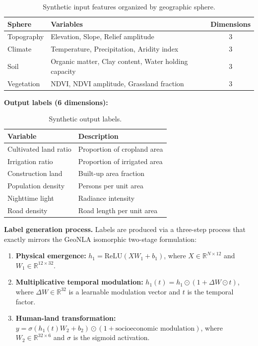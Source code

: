 \documentclass[a4paper,11pt]{article}
\begin{document}
\begin{table}[htbp]
\centering
\caption{Synthetic input features organized by geographic sphere.}
\label{tab:input_features}
\begin{tabular}{llc}
\toprule
Sphere & Variables & Dimensions \\
\midrule
Topography & Elevation, Slope, Relief amplitude & 3 \\
Climate & Temperature, Precipitation, Aridity index & 3 \\
Soil & Organic matter, Clay content, Water holding capacity & 3 \\
Vegetation & NDVI, NDVI amplitude, Grassland fraction & 3 \\
\bottomrule
\end{tabular}
\end{table}

\textbf{Output labels (6 dimensions):}

\begin{table}[htbp]
\centering
\caption{Synthetic output labels.}
\label{tab:output_labels}
\begin{tabular}{ll}
\toprule
Variable & Description \\
\midrule
Cultivated land ratio & Proportion of cropland area \\
Irrigation ratio & Proportion of irrigated area \\
Construction land & Built-up area fraction \\
Population density & Persons per unit area \\
Nighttime light & Radiance intensity \\
Road density & Road length per unit area \\
\bottomrule
\end{tabular}
\end{table}

\textbf{Label generation process.} Labels are produced via a three-step process that exactly mirrors the GeoNLA isomorphic two-stage formulation:

\begin{enumerate}[label=\arabic*.]
    \item \textbf{Physical emergence:} $h_1 = \text{ReLU}(X W_1 + b_1)$, where $X \in \mathbb{R}^{N \times 12}$ and $W_1 \in \mathbb{R}^{12 \times 32}$.
    \item \textbf{Multiplicative temporal modulation:} $h_1(t) = h_1 \odot (1 + \Delta W \odot t)$, where $\Delta W \in \mathbb{R}^{32}$ is a learnable modulation vector and $t$ is the temporal factor.
    \item \textbf{Human-land transformation:} $y = \sigma(h_1(t) W_2 + b_2) \odot (1 + \text{socioeconomic modulation})$, where $W_2 \in \mathbb{R}^{32 \times 6}$ and $\sigma$ is the sigmoid activation.
\end{enumerate}
\end{document}
